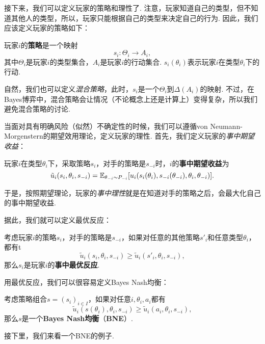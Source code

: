 接下来，我们可以定义玩家的策略和理性了. 注意，玩家知道自己的类型，但不知道其他人的类型，所以，玩家只能根据自己的类型来决定自己的行为. 因此，我们应该定义玩家的策略如下：

\begin{definition}[策略]
    玩家$i$的\textbf{策略}是一个映射
    \[s_i:\Theta_i\to A_i,\]
    其中$\Theta_i$是玩家$i$的类型集合，$A_i$是玩家$i$的行动集合. $s_i(\theta_i)$表示玩家$i$在类型$\theta_i$下的行动.
\end{definition}

\begin{remark}
    自然，我们也可以定义\textit{混合策略}，此时，$s_i$是一个$\Theta_i$到$\Delta(A_i)$的映射. 不过，在Bayes博弈中，混合策略会让情况（不论概念上还是计算上）变得复杂，所以我们避免混合策略的讨论.
\end{remark}

当面对具有明确风险（似然）不确定性的时候，我们可以遵循von Neumann-Morgenstern的期望效用理论，定义玩家的理性. 首先，我们定义玩家的\textit{事中期望收益}：

\begin{definition}[事中期望收益]
    玩家$i$在类型$\theta_i$下，采取策略$s_i$，对手的策略是$s_{-i}$时，$i$的\textbf{事中期望收益}为
    \[\tilde u_i(s_i,\theta_i,s_{-i})=\mathbb{E}_{\theta_{-i}\sim P_{-i}}[u_i(s_i(\theta_i),s_{-i}(\theta_{-i}),\theta_i,\theta_{-i})].\]
\end{definition}

于是，按照期望理论，玩家的\textit{事中理性}就是在知道对手的策略之后，会最大化自己的事中期望收益. 

据此，我们就可以定义最优反应：

\begin{definition}[事中最优反应]
    考虑玩家$i$的策略$s_i$，对手的策略是$s_{-i}$，如果对任意的其他策略$s'_i$和任意类型$\theta_i$，都有t
    \[\tilde u_i(s_i,\theta_i,s_{-i})\geq \tilde u_i(s'_i,\theta_i,s_{-i}),\]
    那么$s_i$是玩家$i$的\textbf{事中最优反应}.
\end{definition}

用最优反应，我们可以很容易定义Bayes Nash均衡：

\begin{definition}
    考虑策略组合$s=(s_i)_{i\in I}$，如果对任意$i,\theta_i,a_i$都有
    \[\tilde u_i(s(\theta_i),\theta_i,s_{-i})\geq \tilde u_i(a_i,\theta_i,s_{-i}),\]
    那么$s$是一个\textbf{Bayes Nash均衡}（\textbf{BNE}）.
\end{definition}

接下里，我们来看一个BNE的例子. 

